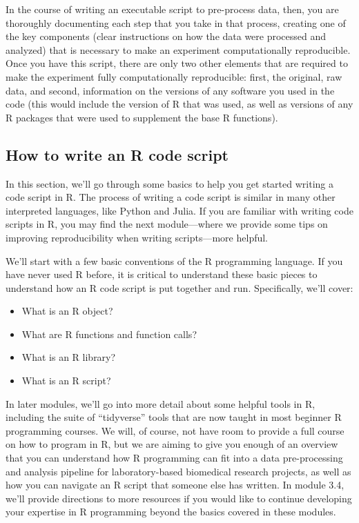 \documentclass[]{tufte-book}
\providecommand{\tightlist}{%
  \setlength{\itemsep}{0pt}\setlength{\parskip}{0pt}}
\begin{document}
In the course of writing an executable script to pre-process data, then, you are
thoroughly documenting each step that you take in that process, creating one of
the key components (clear instructions on how the data were processed and
analyzed) that is necessary to make an experiment computationally reproducible.
Once you have this script, there are only two other elements that are required
to make the experiment fully computationally reproducible: first, the original,
raw data, and second, information on the versions of any software you used in
the code (this would include the version of R that was used, as well as versions
of any R packages that were used to supplement the base R functions).

\subsection{How to write an R code script}\label{how-to-write-an-r-code-script}

In this section, we'll go through some basics to help you get started writing a
code script in R. The process of writing a code script is similar in many other
interpreted languages, like Python and Julia. If you are familiar with writing
code scripts in R, you may find the next module---where we provide some tips on
improving reproducibility when writing scripts---more helpful.

We'll start with a few basic conventions of the R programming language.
If you have never used R before, it is critical to understand these basic
pieces to understand how an R code script is put together
and run. Specifically, we'll cover:

\begin{itemize}
\tightlist
\item
  What is an R object?
\item
  What are R functions and function calls?
\item
  What is an R library?
\item
  What is an R script?
\end{itemize}

In later modules, we'll go into more detail about some helpful tools in R,
including the suite of ``tidyverse'' tools that are now taught in most beginner R
programming courses. We will, of course, not have room to provide a full course
on how to program in R, but we are aiming to give you enough of an overview that you
can understand how R programming can fit into a data pre-processing and analysis
pipeline for laboratory-based biomedical research projects, as well as how you
can navigate an R script that someone else has written. In module 3.4, we'll
provide directions to more resources if you would like to continue developing
your expertise in R programming beyond the basics covered in these modules.
\end{document}

